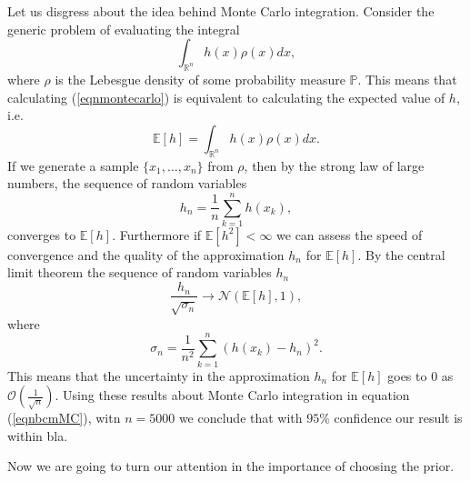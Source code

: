 \documentclass[12pt]{book}
\newcommand{\p}{\mathbb{P}}
\begin{document}
Let us disgress about the idea behind Monte Carlo integration. Consider the generic problem of evaluating the 
integral
\begin{equation}\label{eqnmontecarlo}
\int_{\mathbb{R}^{n}}h(x)\rho(x)dx,
\end{equation}  
where $\rho$ is the Lebesgue density of some probability measure $\p$. This means that calculating (\ref{eqnmontecarlo}) 
is equivalent to calculating the expected value of $h$, i.e.
\begin{equation*}
\mathbb{E}[h]=\int_{\mathbb{R}^{n}}h(x)\rho(x)dx.
\end{equation*}
If we generate a sample $\{x_{1},\ldots,x_{n}\}$ from $\rho$, then by the strong law of large numbers, the sequence of random
variables
\begin{equation*}
h_{n}=\frac{1}{n}\sum_{k=1}^{n} h(x_{k}),
\end{equation*}
converges to $\mathbb{E}[h]$\cite{dudley2002real}. Furthermore if $\mathbb{E}[h^{2}]<\infty$ we can assess the speed of
convergence and the quality of the approximation $h_{n}$ for $\mathbb{E}[h]$. By the central limit theorem
the sequence of random  variables $h_{n}$
\begin{equation*}
\frac{h_{n}}{\sqrt{\sigma_{n}}}\rightarrow \mathcal{N}(\mathbb{E}[h],1),
\end{equation*}
where 
\begin{equation*}
\sigma_{n}=\frac{1}{n^{2}}\sum_{k=1}^{n}(h(x_{k})-h_{n})^{2}.
\end{equation*}
This means that the uncertainty in the approximation $h_{n}$ for $\mathbb{E}[h]$ goes to $0$ as $\mathcal{O}(\frac{1}{\sqrt{n}})$.
Using these results about Monte Carlo integration in equation (\ref{eqnbcmMC}), witn $n=5000$ we conclude that with $95\%$ 
confidence our result is within bla.
\newline

Now we are going to turn our attention in the importance of choosing the prior.
\end{document}
